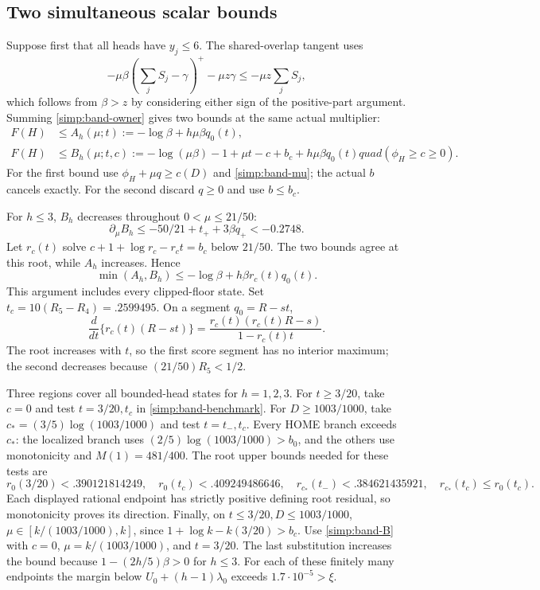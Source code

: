 \subsection{Two simultaneous scalar bounds}

Suppose first that all heads have $y_j\le6$.
The shared-overlap tangent uses
\[
 -\mu\beta(\sum_jS_j-\gamma)^+-\mu z\gamma
 \le-\mu z\sum_jS_j,
\]
which follows from $\beta>z$ by considering either sign of the
positive-part argument. Summing \eqref{simp:band-owner} gives two
bounds at the same actual multiplier:
\begin{align}
 F(H)&\le A_h(\mu;t):=-\log\beta+h\mu\beta q_0(t),
                                                      \label{simp:band-A}\\
 F(H)&\le B_h(\mu;t,c):=-\log(\mu\beta)-1+\mu t-c+b_c
                         +h\mu\beta q_0(t)quad(\phi_H\ge c\ge0).
                                                      \label{simp:band-B}
\end{align}
For the first bound use $\phi_H+\mu q\ge c(D)$ and
\eqref{simp:band-mu}; the actual $b$ cancels exactly.
For the second discard $q\ge0$ and use $b\le b_c$.

For $h\le3$, $B_h$ decreases throughout $0<\mu\le21/50$:
\[
 \partial_\mu B_h\le-50/21+t_++3\beta q_+<-0.2748.
\]
Let $r_c(t)$ solve $c+1+\log r_c-r_ct=b_c$ below $21/50$.
The two bounds agree at this root, while $A_h$ increases. Hence
\begin{equation}\label{simp:band-benchmark}
 \min(A_h,B_h)\le-\log\beta+h\beta r_c(t)q_0(t).
\end{equation}
This argument includes every clipped-floor state.
Set $t_c=10(R_5-R_4)=.2599495$.
On a segment $q_0=R-st$,
\[
 \frac{d}{dt}\{r_c(t)(R-st)\}
 =\frac{r_c(t)(r_c(t)R-s)}{1-r_c(t)t}.
\]
The root increases with $t$, so the first score segment has no
interior maximum; the second decreases because $(21/50)R_5<1/2$.

Three regions cover all bounded-head states for $h=1,2,3$.
For $t\ge3/20$, take $c=0$ and test $t=3/20,t_c$ in
\eqref{simp:band-benchmark}.
For $D\ge1003/1000$, take $c_*=(3/5)\log(1003/1000)$ and
test $t=t_-,t_c$. Every HOME branch exceeds $c_*$:
the localized branch uses $(2/5)\log(1003/1000)>b_0$, and
the others use monotonicity and $M(1)=481/400$.
The root upper bounds needed for these tests are
\[
 r_0(3/20)<.390121814249,\quad r_0(t_c)<.409249486646,
 \quad r_{c_*}(t_-)<.384621435921,
 \quad r_{c_*}(t_c)\le r_0(t_c).
\]
Each displayed rational endpoint has strictly positive defining
root residual, so monotonicity proves its direction.
Finally, on $t\le3/20,D\le1003/1000$,
$\mu\in[k/(1003/1000),k]$, since
$1+\log k-k(3/20)>b_c$.
Use \eqref{simp:band-B} with $c=0$, $\mu=k/(1003/1000)$,
and $t=3/20$. The last substitution increases the bound because
$1-(2h/5)\beta>0$ for $h\le3$.
For each of these finitely many endpoints the margin below
$U_0+(h-1)\lambda_0$ exceeds $1.7\cdot10^{-5}>\xi$.

